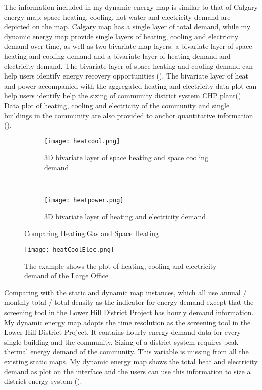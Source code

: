 The information included in my dynamic energy map is similar to that
of Calgary energy map: space heating, cooling, hot water and
electricity demand are depicted on the map. Calgary map has a single
layer of total demand, while my dynamic energy map provide single
layers of heating, cooling and electricity demand over time, as well
as two bivariate map layers: a bivariate layer of space heating and
cooling demand and a bivariate layer of heating demand and electricity
demand. The bivariate layer of space heating and cooling demand can
help users identify energy recovery opportunities
(). The bivariate layer of heat and power
accompanied with the aggregated heating and electricity data plot can
help users identify help the sizing of community district system CHP
plant(). Data plot of heating, cooling and
electricity of the community and single buildings in the community are
also provided to anchor quantitative information
().

\begin{figure}[h!]
  \centering
  \begin{subfigure}{0.4\textwidth}
  \centering
  \texttt{[image: heatcool.png]}
  \caption[Bivariate Layer of Heating and Cooling]{3D bivariate layer
    of space heating and space cooling demand}
  \label{fig:heatcool}
\end{subfigure}
~
\begin{subfigure}{0.4\textwidth}
  \centering
  \texttt{[image: heatpower.png]}
  \caption[Bivariate Layer of Heating and Electricity]{3D bivariate
    layer of heating and electricity demand}
  \label{fig:heatpower}
\end{subfigure}
\caption[Comparing Heating:Gas and Space Heating]{Comparing
  Heating:Gas and Space Heating}
\end{figure}

\begin{figure}[h!]
  \centering
  \texttt{[image: heatCoolElec.png]}
  \caption[Plot of Heating, Cooling and Electricity]{The example shows
    the plot of heating, cooling and electricity demand of the Large
    Office}
  \label{fig:heatCoolElec}
\end{figure}

Comparing with the static and dynamic map instances, which all use
annual / monthly total / total density as the indicator for energy
demand except that the screening tool in the Lower Hill District
Project has hourly demand information. My dynamic energy map adopts
the time resolution as the screening tool in the Lower Hill District
Project. It contains hourly energy demand data for every single
building and the community. Sizing of a district system requires peak
thermal energy demand of the community. This variable is missing from
all the existing static maps. My dynamic energy map shows the total
heat and electricity demand as plot on the interface and the users can
use this information to size a district energy system
(). 

